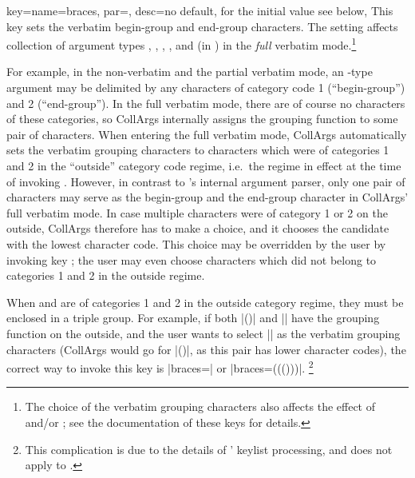 \documentclass[a4paper,11pt]{article}
\begin{document}
\begin{doc}[
    pi=\docaux{cmd}{collargsBraces}
  ]{
    key={name=braces, par={},
      desc={no default, for the initial value see below}},
  }%
  This key sets the verbatim begin-group and end-group characters.  The setting
  affects collection of argument types , ,
  , ,  and (in
  )  in the \emph{full} verbatim
  mode.\footnote{The choice of the verbatim grouping characters also affects
    the effect of  and\slash or ;
    see the documentation of these keys for details.}

  For example, in the non-verbatim and the partial verbatim mode, an
  -type argument may be delimited by any characters of
  category code 1 (``begin-group'') and 2 (``end-group'').  In the full
  verbatim mode, there are of course no characters of these categories, so
  CollArgs internally assigns the grouping function to some pair of characters.
  When entering the full verbatim mode, CollArgs automatically sets the
  verbatim grouping characters to characters which were of categories 1 and 2
  in the ``outside'' category code regime, i.e.\ the regime in effect at the
  time of invoking .  However, in contrast to
  's internal argument parser, only one pair of characters may
  serve as the begin-group and the end-group character in CollArgs' full
  verbatim mode.  In case multiple characters were of category 1 or 2 on the
  outside, CollArgs therefore has to make a choice, and it chooses the
  candidate with the lowest character code.  This choice may be overridden by
  the user by invoking key ; the user may even choose
  characters which did not belong to categories 1 and 2 in the outside regime.

  When  and  are of categories 1
  and 2 in the outside category regime, they must be enclosed in a triple
  group.  For example, if both |()| and |{}| have the grouping function on the
  outside, and the user wants to select |{}| as the verbatim grouping
  characters (CollArgs would go for |()|, as this pair has lower character
  codes), the correct way to invoke this key is |braces={{{{}}}}| or
  |braces=((({})))|.  \footnote{This complication is due to the details of
    ' keylist processing, and does not apply to
    .}
\end{doc}
\end{document}
